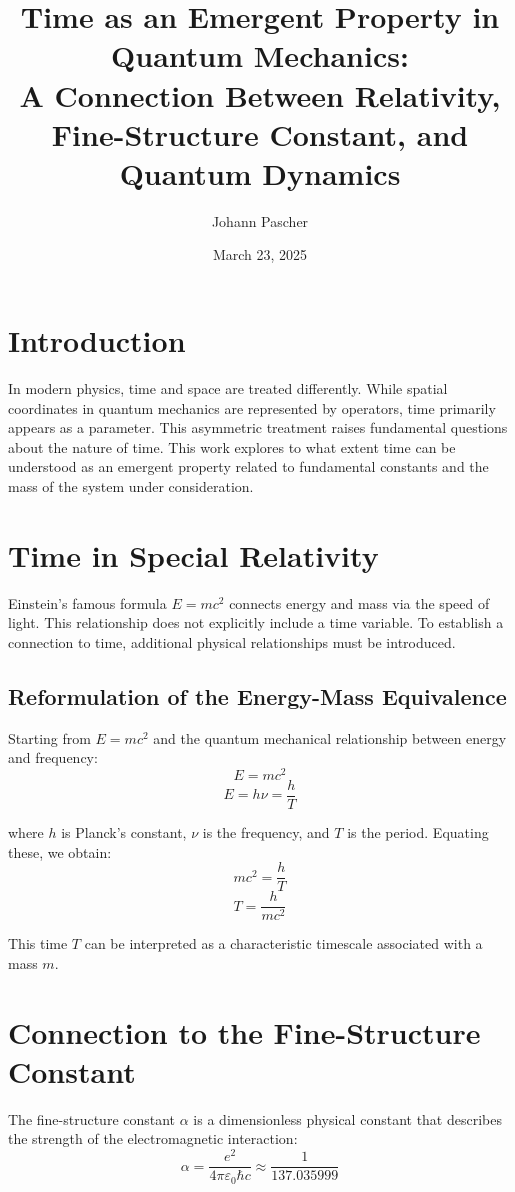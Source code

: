 \documentclass{article}
\title{Time as an Emergent Property in Quantum Mechanics: \\A Connection Between Relativity, Fine-Structure Constant, and Quantum Dynamics}
\author{Johann Pascher}
\date{March 23, 2025}
\begin{document}
	
	\maketitle
	
	\section{Introduction}
	
	In modern physics, time and space are treated differently. While spatial coordinates in quantum mechanics are represented by operators, time primarily appears as a parameter. This asymmetric treatment raises fundamental questions about the nature of time. This work explores to what extent time can be understood as an emergent property related to fundamental constants and the mass of the system under consideration.
	
	\tableofcontents
	
	\section{Time in Special Relativity}
	
	Einstein's famous formula \(E = mc^2\) connects energy and mass via the speed of light. This relationship does not explicitly include a time variable. To establish a connection to time, additional physical relationships must be introduced.
	
	\subsection{Reformulation of the Energy-Mass Equivalence}
	
	Starting from \(E = mc^2\) and the quantum mechanical relationship between energy and frequency:
	\[
	E = mc^2
	\]
	\[
	E = h\nu = \frac{h}{T}
	\]
	
	where \(h\) is Planck's constant, \(\nu\) is the frequency, and \(T\) is the period. Equating these, we obtain:
	\[
	mc^2 = \frac{h}{T}
	\]
	\[
	T = \frac{h}{mc^2}
	\]
	
	This time \(T\) can be interpreted as a characteristic timescale associated with a mass \(m\).
	
	\section{Connection to the Fine-Structure Constant}
	
	The fine-structure constant \(\alpha\) is a dimensionless physical constant that describes the strength of the electromagnetic interaction:
	\[
	\alpha = \frac{e^2}{4\pi\varepsilon_0\hbar c} \approx \frac{1}{137.035999}
	\]
	
\end{document}
